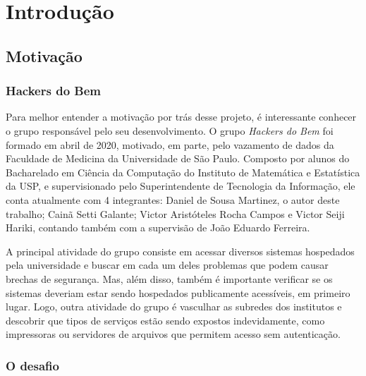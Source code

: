 
\chapter{Introdução}
\label{cap:introducao}



\section{Motivação}

\subsection{Hackers do Bem}
Para melhor entender a motivação por trás desse projeto, é interessante conhecer o grupo responsável pelo seu desenvolvimento. O grupo \textit{Hackers do Bem} foi formado em abril de 2020, motivado, em parte, pelo vazamento de dados da Faculdade de Medicina da Universidade de São Paulo. Composto por alunos do Bacharelado em Ciência da Computação do Instituto de Matemática e Estatística da USP, e supervisionado pelo Superintendente de Tecnologia da Informação, ele conta atualmente com 4 integrantes: Daniel de Sousa Martinez, o autor deste trabalho; Cainã Setti Galante; Victor Aristóteles Rocha Campos e Victor Seiji Hariki, contando também com a supervisão de João Eduardo Ferreira.

A principal atividade do grupo consiste em acessar diversos sistemas hospedados pela universidade e buscar em cada um deles problemas que podem causar brechas de segurança. Mas, além disso, também é importante verificar se os sistemas deveriam estar sendo hospedados publicamente acessíveis, em primeiro lugar. Logo, outra atividade do grupo é vasculhar as subredes
dos institutos e descobrir que tipos de serviços estão sendo expostos indevidamente, como impressoras ou servidores de arquivos que permitem acesso sem autenticação. 


% 
\subsection{O desafio}

